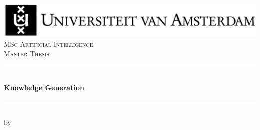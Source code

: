 \documentclass{article}
\begin{document}
\begin{titlepage}



\newcommand{\HRule}{\rule{\linewidth}{0.5mm}} %

\center %

 






\includegraphics[width=\linewidth]{data/images/uvaENG}\\[2.5cm]

\textsc{\Large MSc Artificial Intelligence}\\[0.2cm]

\textsc{\Large Master Thesis}\\[0.5cm] 








\HRule \\[0.4cm]

{ \huge \bfseries Knowledge Generation \\[0.4cm] } %

\HRule \\[0.5cm]

 






by\\[0.2cm]


\end{titlepage}
\end{document}
